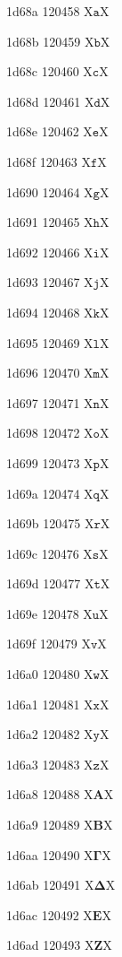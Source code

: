 \documentclass[11pt]{article}
\begin{document}
1d68a 120458 X{\ensuremath{\mathtt{a}}}X

1d68b 120459 X{\ensuremath{\mathtt{b}}}X

1d68c 120460 X{\ensuremath{\mathtt{c}}}X

1d68d 120461 X{\ensuremath{\mathtt{d}}}X

1d68e 120462 X{\ensuremath{\mathtt{e}}}X

1d68f 120463 X{\ensuremath{\mathtt{f}}}X

1d690 120464 X{\ensuremath{\mathtt{g}}}X

1d691 120465 X{\ensuremath{\mathtt{h}}}X

1d692 120466 X{\ensuremath{\mathtt{i}}}X

1d693 120467 X{\ensuremath{\mathtt{j}}}X

1d694 120468 X{\ensuremath{\mathtt{k}}}X

1d695 120469 X{\ensuremath{\mathtt{l}}}X

1d696 120470 X{\ensuremath{\mathtt{m}}}X

1d697 120471 X{\ensuremath{\mathtt{n}}}X

1d698 120472 X{\ensuremath{\mathtt{o}}}X

1d699 120473 X{\ensuremath{\mathtt{p}}}X

1d69a 120474 X{\ensuremath{\mathtt{q}}}X

1d69b 120475 X{\ensuremath{\mathtt{r}}}X

1d69c 120476 X{\ensuremath{\mathtt{s}}}X

1d69d 120477 X{\ensuremath{\mathtt{t}}}X

1d69e 120478 X{\ensuremath{\mathtt{u}}}X

1d69f 120479 X{\ensuremath{\mathtt{v}}}X

1d6a0 120480 X{\ensuremath{\mathtt{w}}}X

1d6a1 120481 X{\ensuremath{\mathtt{x}}}X

1d6a2 120482 X{\ensuremath{\mathtt{y}}}X

1d6a3 120483 X{\ensuremath{\mathtt{z}}}X

1d6a8 120488 X{\ensuremath{\mathbf{A}}}X

1d6a9 120489 X{\ensuremath{\mathbf{B}}}X

1d6aa 120490 X{\ensuremath{\mathbf{\Gamma}}}X

1d6ab 120491 X{\ensuremath{\mathbf{\Delta}}}X

1d6ac 120492 X{\ensuremath{\mathbf{E}}}X

1d6ad 120493 X{\ensuremath{\mathbf{Z}}}X
\end{document}
